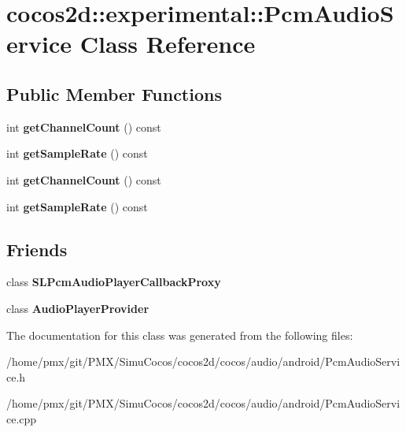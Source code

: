 \hypertarget{classcocos2d_1_1experimental_1_1PcmAudioService}{}\section{cocos2d\+:\+:experimental\+:\+:Pcm\+Audio\+Service Class Reference}
\label{classcocos2d_1_1experimental_1_1PcmAudioService}
\subsection*{Public Member Functions}
\begin{DoxyCompactItemize}
\item 
\mbox{\label{classcocos2d_1_1experimental_1_1PcmAudioService_a6919b835aae3ddbfb499f030f72e9f13}} 
int {\bfseries get\+Channel\+Count} () const
\item 
\mbox{\label{classcocos2d_1_1experimental_1_1PcmAudioService_a2284e55669d63aed04d387e767765126}} 
int {\bfseries get\+Sample\+Rate} () const
\item 
\mbox{\label{classcocos2d_1_1experimental_1_1PcmAudioService_a6919b835aae3ddbfb499f030f72e9f13}} 
int {\bfseries get\+Channel\+Count} () const
\item 
\mbox{\label{classcocos2d_1_1experimental_1_1PcmAudioService_a2284e55669d63aed04d387e767765126}} 
int {\bfseries get\+Sample\+Rate} () const
\end{DoxyCompactItemize}
\subsection*{Friends}
\begin{DoxyCompactItemize}
\item 
\mbox{\label{classcocos2d_1_1experimental_1_1PcmAudioService_a094debe75ea6bce751afbdd265dac8e4}} 
class {\bfseries S\+L\+Pcm\+Audio\+Player\+Callback\+Proxy}
\item 
\mbox{\label{classcocos2d_1_1experimental_1_1PcmAudioService_a0843db55a3a12f76fc06297731df3ac3}} 
class {\bfseries Audio\+Player\+Provider}
\end{DoxyCompactItemize}


The documentation for this class was generated from the following files\+:\begin{DoxyCompactItemize}
\item 
/home/pmx/git/\+P\+M\+X/\+Simu\+Cocos/cocos2d/cocos/audio/android/Pcm\+Audio\+Service.\+h\item 
/home/pmx/git/\+P\+M\+X/\+Simu\+Cocos/cocos2d/cocos/audio/android/Pcm\+Audio\+Service.\+cpp\end{DoxyCompactItemize}
